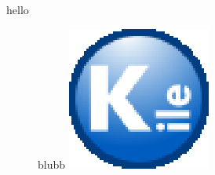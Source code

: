 \providecommand{\bloehhhhhhhhh}{test} %

\newenvironment{hello}{test \%}{\section{ERROR}}
\newenvironment{helloo}[2]{test \%}{\section{ERROR}}
\newenvironment{hellooo}[3][stdarg]{test \%}{\section{ERROR}} %

\renewcommand{\section}[2]{asd} %

\DeclareMathOperator{\destroyer}{D}
\DeclareMathOperator*{\destroyerr}{D}










%

{hello}

\begin{figure}[htb]
blubb
	\includegraphics{./teppich.eps}
\end{figure}

